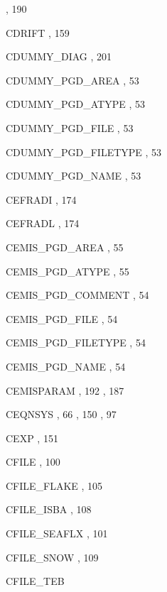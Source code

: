\begin{theindex}
    \subitem {},  190
  \item CDRIFT
    \subitem {},  159
  \item CDUMMY\_DIAG
    \subitem {},  201
  \item CDUMMY\_PGD\_AREA
    \subitem {},  53
  \item CDUMMY\_PGD\_ATYPE
    \subitem {},  53
  \item CDUMMY\_PGD\_FILE
    \subitem {},  53
  \item CDUMMY\_PGD\_FILETYPE
    \subitem {},  53
  \item CDUMMY\_PGD\_NAME
    \subitem {},  53
  \item CEFRADI
    \subitem {},  174
  \item CEFRADL
    \subitem {},  174
  \item CEMIS\_PGD\_AREA
    \subitem {},  55
  \item CEMIS\_PGD\_ATYPE
    \subitem {},  55
  \item CEMIS\_PGD\_COMMENT
    \subitem {},  54
  \item CEMIS\_PGD\_FILE
    \subitem {},  54
  \item CEMIS\_PGD\_FILETYPE
    \subitem {},  54
  \item CEMIS\_PGD\_NAME
    \subitem {},  54
  \item CEMISPARAM
    \subitem {},  192
    \subitem {},  187
  \item CEQNSYS
    \subitem {},  66
    \subitem {},  150
    \subitem {},  97
  \item CEXP
    \subitem {},  151
  \item CFILE
    \subitem {},  100
  \item CFILE\_FLAKE
    \subitem {},  105
  \item CFILE\_ISBA
    \subitem {},  108
  \item CFILE\_SEAFLX
    \subitem {},  101
  \item CFILE\_SNOW
    \subitem {},  109
  \item CFILE\_TEB

\end{theindex}
